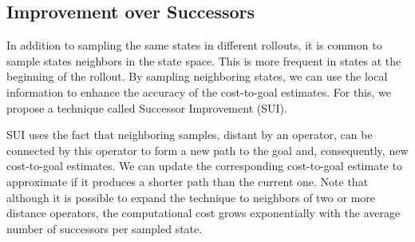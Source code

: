 \subsection{Improvement over Successors}
\label{sec:sui}

In addition to sampling the same states in different rollouts, it is common to sample states neighbors in the state space. This is more frequent in states at the beginning of the rollout. By sampling neighboring states, we can use the local information to enhance the accuracy of the cost-to-goal estimates. For this, we propose a technique called Successor Improvement (SUI).

SUI uses the fact that neighboring samples, distant by an operator, can be connected by this operator to form a new path to the goal and, consequently, new cost-to-goal estimates. We can update the corresponding cost-to-goal estimate to approximate \hstar if it produces a shorter path than the current one. Note that although it is possible to expand the technique to neighbors of two or more distance operators, the computational cost grows exponentially with the average number of successors per sampled state.






